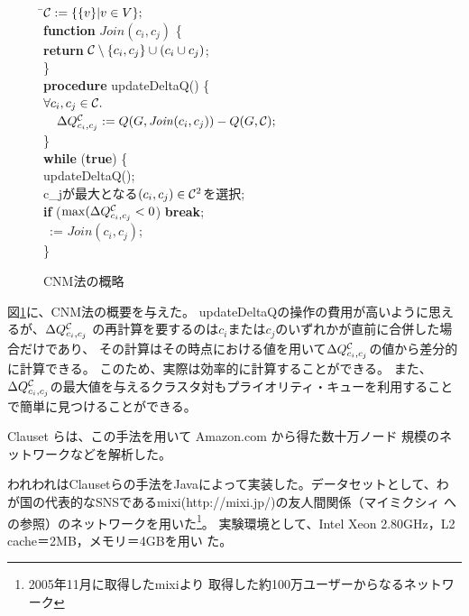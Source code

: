 \documentclass [a4j,11pt] {jsarticle}
\begin{document}
\begin {figure}
\begin {tabbing}
\hspace {.3\linewidth}\=${\cal C} := \{\{v\} | v \in V\};$ \medskip\\
\>\textbf {function} $\mathit {Join}(c_i, c_j)$ \{\\
\>\quad \=\textbf {return} ${\cal C} \setminus \{c_i, c_j\} \cup (c_i \cup c_j)$; \\
\>\} \medskip\\
\>\textbf {procedure} updateDeltaQ() \{\\
\>\>$\forall c_i, c_j \in {\cal C}.$\\
\>\>$\quad\Delta Q^{{\cal C}}_{c_i,c_j}:=Q(G, \mathit {Join}(c_i, c_j)) - Q(G, {\cal C});$\\
\>\} \medskip\\
\>\textbf {while} (\textbf {true}) \{\\
\>\>updateDeltaQ(); \\
\>\>\DQ {} {c_j}が最大となる$(c_i, c_j) \in {\cal C}^2 $を選択;\\
\>\>\textbf {if} ($\max(\Delta Q^{{\cal C}}_{c_i,c_j} < 0$) \textbf {break};\medskip\\
\>\>\clustering\ := $\mathit {Join}(c_i, c_j)$;\\
\>\}
\end {tabbing}
\caption {CNM法\cite{clauset-2004-finding-community-structure-in-very-large}の概略}
\label {fig: cnm algorithm}
\end {figure}

図\ref{fig: cnm algorithm}に、CNM法の概要を与えた。
updateDeltaQの操作の費用が高いように思えるが、$\Delta Q^{{\cal C}}_{c_i,c_j}$
の再計算を要するのは${c_i}$または${c_j}$のいずれかが直前に合併した場合だけであり、
その計算はその時点における値を用いて$\Delta Q^{{\cal C}}_{c_i,c_j}$の値から差分的に計算できる。
このため、実際は効率的に計算することができる。
また、$\Delta Q^{{\cal C}}_{c_i,c_j}$の最大値を与えるクラスタ対もプライオリティ・キューを利用することで簡単に見つけることができる。

Clauset らは、この手法を用いて Amazon.com から得た数十万ノード
規模のネットワークなどを解析した。

われわれはClausetらの手法をJavaによって実装した。データセットとして、わ
が国の代表的なSNSであるmixi(http://mixi.jp/)の友人間関係（マイミクシィ
への参照）のネットワークを用いた\footnote {2005年11月に取得したmixiより
取得した約100万ユーザーからなるネットワーク}。
実験環境として、Intel Xeon 2.80GHz，L2 cache＝2MB，メモリ＝4GBを用い
た。
\end{document}
